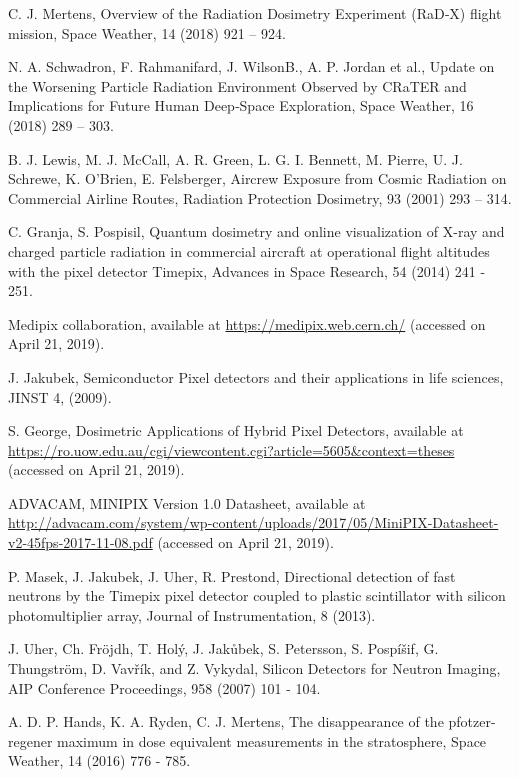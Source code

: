 \begin{thebibliography}{00}
 C. J. Mertens, Overview of the Radiation Dosimetry Experiment (RaD‐X) flight mission, Space Weather, 14 (2018) 921 – 924.  
  
 N. A. Schwadron, F. Rahmanifard, J. WilsonB., A. P. Jordan et al., Update on the Worsening Particle Radiation Environment Observed by CRaTER and Implications for Future Human Deep‐Space Exploration, Space Weather, 16 (2018) 289 – 303.  
  
 B. J. Lewis, M. J. McCall, A. R. Green, L. G. I. Bennett, M. Pierre, U. J. Schrewe, K. O'Brien, E. Felsberger, Aircrew Exposure from Cosmic Radiation on Commercial Airline Routes, Radiation Protection Dosimetry, 93 (2001) 293 – 314.
  
 C. Granja, S. Pospisil, Quantum dosimetry and online visualization of X-ray and charged particle radiation in commercial aircraft at operational flight altitudes with the pixel detector Timepix, Advances in Space Research, 54 (2014) 241 - 251.

  Medipix collaboration, available at \url{https://medipix.web.cern.ch/} (accessed on April 21, 2019).

  J. Jakubek, Semiconductor Pixel detectors and their applications in life sciences, JINST 4, (2009).
  
  S. George, Dosimetric Applications of Hybrid Pixel Detectors, available at \url{https://ro.uow.edu.au/cgi/viewcontent.cgi?article=5605&context=theses} (accessed on April 21, 2019).

  ADVACAM, MINIPIX Version 1.0 Datasheet, available at \url{http://advacam.com/system/wp-content/uploads/2017/05/MiniPIX-Datasheet-v2-45fps-2017-11-08.pdf} (accessed on April 21, 2019).  

  P. Masek, J. Jakubek, J. Uher, R. Prestond, Directional detection of fast neutrons by the Timepix pixel detector coupled to plastic scintillator with silicon photomultiplier array, Journal of Instrumentation, 8 (2013).

  J. Uher, Ch. Fröjdh, T. Holý, J. Jakůbek, S. Petersson, S. Pospíšif, G. Thungström, D. Vavřík, and Z. Vykydal, Silicon Detectors for Neutron Imaging, AIP Conference Proceedings, 958 (2007) 101 - 104.

  A. D. P. Hands, K. A. Ryden, C. J. Mertens, The disappearance of the pfotzer-regener maximum in dose equivalent measurements in the stratosphere, Space Weather, 14 (2016) 776 - 785.

\end{thebibliography}
